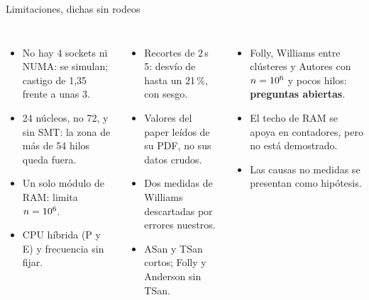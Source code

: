 \begin{frame}{Limitaciones, dichas sin rodeos}
  \begin{columns}[T]
    \begin{itemize}\scriptsize
      \item No hay 4 sockets ni NUMA: se simulan; castigo de 1,35\por{} frente a unas 3\por.
      \item 24 núcleos, no 72, y sin SMT: la zona de más de 54 hilos queda fuera.
      \item Un solo módulo de RAM: limita $n = 10\textsuperscript{6}$.
      \item CPU híbrida (P y E) y frecuencia sin fijar.
    \end{itemize}
    \begin{itemize}\scriptsize
      \item Recortes de 2\,s \por{} 5: desvío de hasta un 21\,\%, con sesgo.
      \item Valores del paper leídos de su PDF, no sus datos crudos.
      \item Dos medidas de Williams descartadas por errores nuestros.
      \item ASan y TSan cortos; Folly y Anderson sin TSan.
    \end{itemize}
    \begin{itemize}\scriptsize
      \item Folly, Williams entre clústeres y Autores con $n = 10\textsuperscript{6}$ y pocos hilos: \textbf{preguntas abiertas}.
      \item El techo de RAM se apoya en contadores, pero no está demostrado.
      \item Las causas no medidas se presentan como hipótesis.
    \end{itemize}
  \end{columns}
  \vfill
\end{frame}

